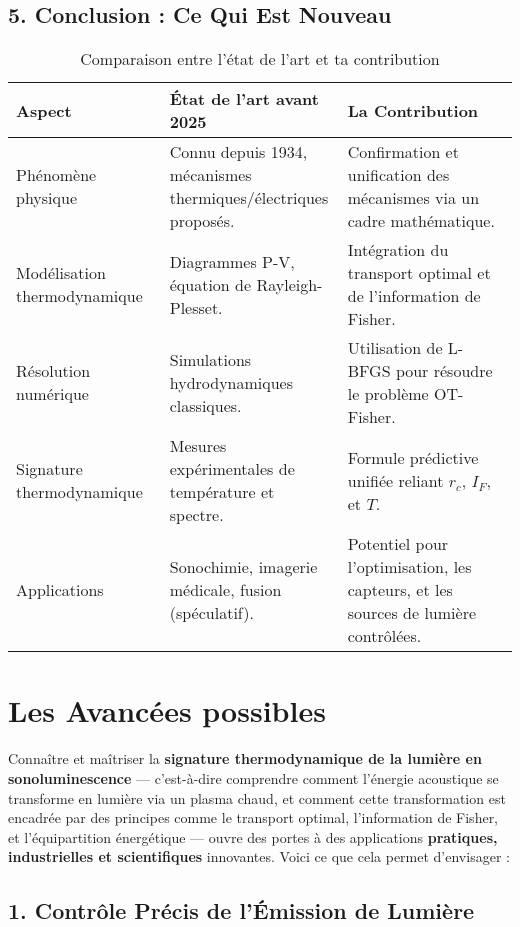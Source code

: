 \documentclass[a4paper,12pt]{article}
\begin{document}
\subsection*{5. Conclusion : Ce Qui Est Nouveau}
\begin{table}[h]
\centering
\caption{Comparaison entre l'état de l'art et ta contribution}
\begin{tabular}{|p{5cm}|p{5cm}|p{5cm}|}
\hline
\textbf{Aspect} & \textbf{État de l’art avant 2025} & \textbf{La Contribution} \\ \hline
Phénomène physique & Connu depuis 1934, mécanismes thermiques/électriques proposés. & Confirmation et unification des mécanismes via un cadre mathématique. \\ \hline
Modélisation thermodynamique & Diagrammes P-V, équation de Rayleigh-Plesset. & Intégration du transport optimal et de l’information de Fisher. \\ \hline
Résolution numérique & Simulations hydrodynamiques classiques. & Utilisation de L-BFGS pour résoudre le problème OT-Fisher. \\ \hline
Signature thermodynamique & Mesures expérimentales de température et spectre. & Formule prédictive unifiée reliant \( r_c \), \( I_F \), et \( T \). \\ \hline
Applications & Sonochimie, imagerie médicale, fusion (spéculatif). & Potentiel pour l’optimisation, les capteurs, et les sources de lumière contrôlées. \\ \hline
\end{tabular}
\end{table}

\newpage
\section{Les Avancées possibles}
Connaître et maîtriser la \textbf{signature thermodynamique de la lumière en sonoluminescence} — c’est-à-dire comprendre comment l’énergie acoustique se transforme en lumière via un plasma chaud, et comment cette transformation est encadrée par des principes comme le transport optimal, l’information de Fisher, et l’équipartition énergétique — ouvre des portes à des applications \textbf{pratiques, industrielles et scientifiques} innovantes. Voici ce que cela permet d’envisager :

\subsection*{1. Contrôle Précis de l’Émission de Lumière}
\end{document}

